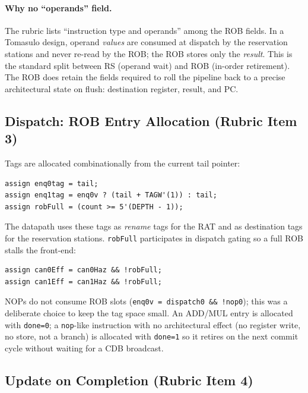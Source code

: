 \documentclass[11pt]{article}
\begin{document}
\paragraph{Why no ``operands'' field.} The rubric lists ``instruction type and
operands'' among the ROB fields. In a Tomasulo design, operand \emph{values}
are consumed at dispatch by the reservation stations and never re-read by the
ROB; the ROB stores only the \emph{result}. This is the standard split between
RS (operand wait) and ROB (in-order retirement). The ROB does retain the
fields required to roll the pipeline back to a precise architectural state on
flush: destination register, result, and PC.

\subsection{Dispatch: ROB Entry Allocation (Rubric Item 3)}

Tags are allocated combinationally from the current tail pointer:

\begin{lstlisting}[style=verilog, caption=Two-wide ROB tag allocation]
assign enq0tag = tail;
assign enq1tag = enq0v ? (tail + TAGW'(1)) : tail;
assign robFull = (count >= 5'(DEPTH - 1));
\end{lstlisting}

The datapath uses these tags as \emph{rename} tags for the RAT and as
destination tags for the reservation stations. \texttt{robFull} participates in
dispatch gating so a full ROB stalls the front-end:

\begin{lstlisting}[style=verilog, caption=ROB full participates in dispatch gating (datapath.sv)]
assign can0Eff = can0Haz && !robFull;
assign can1Eff = can1Haz && !robFull;
\end{lstlisting}

NOPs do not consume ROB slots (\texttt{enq0v = dispatch0 \&\& !nop0}); this was
a deliberate choice to keep the tag space small. An ADD/MUL entry is allocated
with \texttt{done=0}; a \texttt{nop}-like instruction with no architectural
effect (no register write, no store, not a branch) is allocated with
\texttt{done=1} so it retires on the next commit cycle without waiting for a
CDB broadcast.

\subsection{Update on Completion (Rubric Item 4)}
\end{document}
